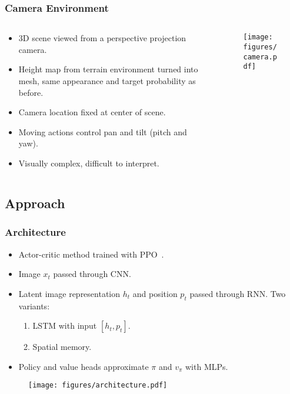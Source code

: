 \begin{frame}
    \frametitle{Camera Environment}
    \begin{columns}
        \begin{column}{0.5\textwidth}
            \begin{itemize}
                \item 3D scene viewed from a perspective projection camera.
                \item Height map from terrain environment turned into mesh, same appearance and target probability as before.
                \item Camera location fixed at center of scene.
                \item Moving actions control pan and tilt (pitch and yaw).
                \item Visually complex, difficult to interpret.
            \end{itemize}
        \end{column}
        \begin{column}{0.5\textwidth}
            \begin{figure}
                \centering
                \texttt{[image: figures/camera.pdf]}
            \end{figure}
        \end{column}
    \end{columns}
\end{frame}

\subsection{Approach}

\begin{frame}
    \frametitle{Architecture}

    \begin{itemize}
        \item Actor-critic method trained with PPO~\cite{schulman_proximal_2017}.
        \item Image \(x_t\) passed through CNN.
        \item Latent image representation \(h_t\) and position \(p_t\) passed through RNN. Two variants:
        \begin{enumerate}
            \item LSTM with input \(\left\lbrack h_t, p_t \right\rbrack\).
            \item Spatial memory.
        \end{enumerate}
        \item Policy and value heads approximate \(\pi\) and \(v_\pi\) with MLPs.
    \end{itemize}

    \begin{figure}
        \centering
        \texttt{[image: figures/architecture.pdf]}
    \end{figure}
\end{frame}


